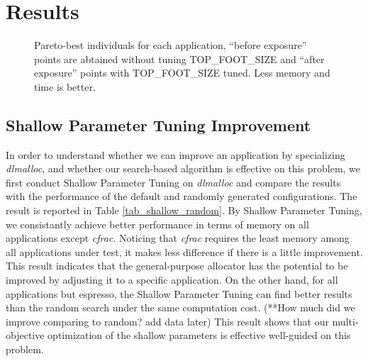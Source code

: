 
\section{Results}

\begin{figure*}[htbp]
	\centering
	\caption{Pareto-best individuals for each application, ``before exposure'' points are abtained without tuning TOP\_FOOT\_SIZE and ``after exposure'' points with TOP\_FOOT\_SIZE tuned. Less memory and time is better.}\label{fig_10}
\end{figure*}

\subsection{Shallow Parameter Tuning Improvement}

\begin{table}[hbtp]
\centering
\caption{Least memory consumption found by Shallow Parameter Tuning and Random Search (**waiting for results)}
\label{tab_shallow_random}
\end{table}

In order to understand whether we can improve an application by specializing \emph{dlmalloc}, and whether our search-based algorithm is effective on this problem, we first conduct Shallow Parameter Tuning on \emph{dlmalloc} and compare the results with the performance of the default and randomly generated configurations. The result is reported in Table \ref{tab_shallow_random}. By Shallow Parameter Tuning, we consistantly achieve better performance in terms of memory on all applications except \emph{cfrac}. Noticing that \emph{cfrac} requires the least memory among all applications under test, it makes less difference if there is a little improvement. This result indicates that the general-purpose allocator has the potential to be improved by adjusting it to a specific application. On the other hand, for all applications but espresso, the Shallow Parameter Tuning can find better results than the random search under the same computation cost. (**How much did we improve comparing to random? add data later) This result shows that our multi-objective optimization of the shallow parameters is effective well-guided on this problem.

